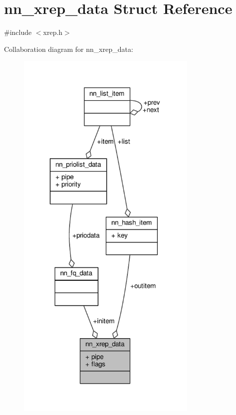 \hypertarget{structnn__xrep__data}{}\section{nn\+\_\+xrep\+\_\+data Struct Reference}
\label{structnn__xrep__data}


{\ttfamily \#include $<$xrep.\+h$>$}



Collaboration diagram for nn\+\_\+xrep\+\_\+data\+:\nopagebreak
\begin{figure}[H]
\begin{center}
\leavevmode
\includegraphics[width=245pt]{structnn__xrep__data__coll__graph}
\end{center}
\end{figure}
